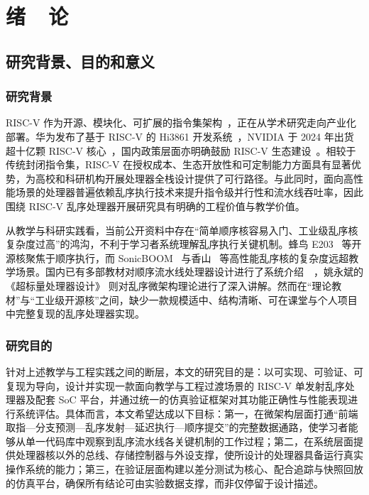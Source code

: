 
\chapter[绪论]{绪~~论}

\section{研究背景、目的和意义}

\subsection{研究背景}

RISC-V 作为开源、模块化、可扩展的指令集架构~\cite{patterson2017riscv}，正在从学术研究走向产业化部署。华为发布了基于 RISC-V 的 Hi3861 开发系统~\cite{huawei2021hi3861}，NVIDIA 于 2024 年出货超十亿颗 RISC-V 核心~\cite{nvidia2024riscv}，国内政策层面亦明确鼓励 RISC-V 生态建设~\cite{china2025riscv}。相较于传统封闭指令集，RISC-V 在授权成本、生态开放性和可定制能力方面具有显著优势，为高校和科研机构开展处理器全栈设计提供了可行路径。与此同时，面向高性能场景的处理器普遍依赖乱序执行技术来提升指令级并行性和流水线吞吐率，因此围绕 RISC-V 乱序处理器开展研究具有明确的工程价值与教学价值。

从教学与科研实践看，当前公开资料中存在“简单顺序核容易入门、工业级乱序核复杂度过高”的鸿沟，不利于学习者系统理解乱序执行关键机制。蜂鸟 E203~\cite{hbirdv2} 等开源核聚焦于顺序执行，而 SonicBOOM~\cite{zhao2020sonicboom} 与香山~\cite{wang2023xiangshan} 等高性能乱序核的复杂度远超教学场景。国内已有多部教材对顺序流水线处理器设计进行了系统介绍~\cite{lei2014cpu}~\cite{wang2021cpudesign}，姚永斌的《超标量处理器设计》\cite{yao2014superscalar} 则对乱序微架构理论进行了深入讲解。然而在“理论教材”与“工业级开源核”之间，缺少一款规模适中、结构清晰、可在课堂与个人项目中完整复现的乱序处理器实现。

\subsection{研究目的}

针对上述教学与工程实践之间的断层，本文的研究目的是：以可实现、可验证、可复现为导向，设计并实现一款面向教学与工程过渡场景的 RISC-V 单发射乱序处理器及配套 SoC 平台，并通过统一的仿真验证框架对其功能正确性与性能表现进行系统评估。具体而言，本文希望达成以下目标：第一，在微架构层面打通“前端取指—分支预测—乱序发射—延迟执行—顺序提交”的完整数据通路，使学习者能够从单一代码库中观察到乱序流水线各关键机制的工作过程；第二，在系统层面提供处理器核以外的总线、存储控制器与外设支撑，使所设计的处理器具备运行真实操作系统的能力；第三，在验证层面构建以差分测试为核心、配合追踪与快照回放的仿真平台，确保所有结论可由实验数据支撑，而非仅停留于设计描述。

